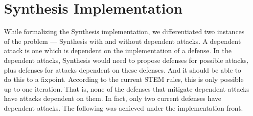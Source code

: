 \documentclass{article}
\begin{document}
\section{Synthesis Implementation}
	While formalizing the Synthesis implementation,
	we differentiated two instances of the 
	problem --- Synthesis with and without 
	dependent attacks. A dependent attack is 
	one which is dependent on the implementation 
	of a defense. In the dependent attacks, 
	Synthesis would need to propose defenses for 
	possible attacks, plus defenses for attacks 
	dependent on these defenses. And it should 
	be able to do this to a fixpoint. According
	to the current STEM rules, this is only 
	possible up to one iteration. That is, none
	of the defenses that mitigate dependent 
	attacks have attacks dependent on them. In 
	fact, only two current defenses have dependent
	attacks. The following was achieved under the 
	implementation front.
\end{document}
